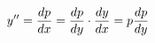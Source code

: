 \documentclass[preview]{standalone}
\begin{document}
\begin{align*}
\special{dvisvgm:raw <g id='unique000'>}y'' = \frac{dp}{dx} = \frac{dp}{dy} \cdot \frac{dy}{dx} = p\frac{dp}{dy}\special{dvisvgm:raw </g>}
\end{align*}
\end{document}
